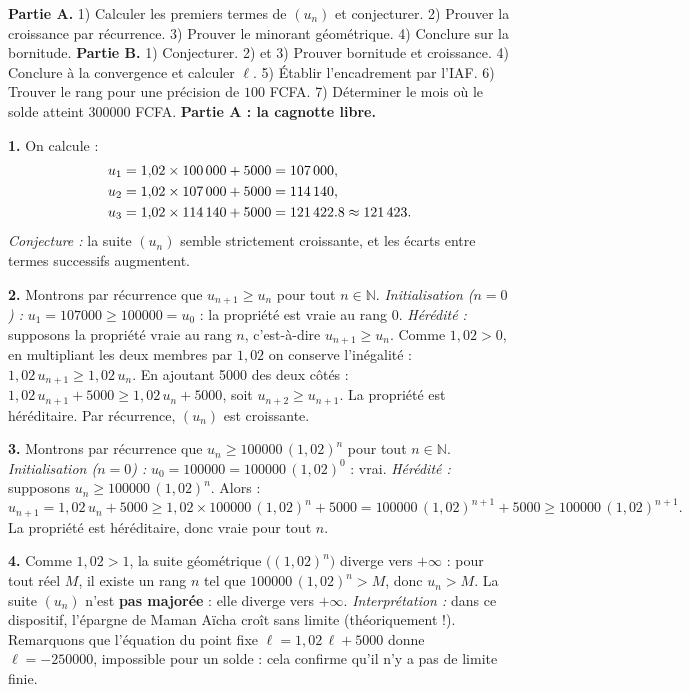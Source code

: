 \documentclass[11pt]{article}
\newcommand{\cle}[1]{{\popxbold\color{popdark}#1}}
\newcounter{popsec}
\newcounter{popsub}
\newcommand{\courssub}[1]{%
  \stepcounter{popsub}%
  \par\vspace{9pt}\noindent{\popxbold\fontsize{11.5}{13}\selectfont\color{popink}{\color{poporange}\thepopsec.\thepopsub}\hspace{6pt}#1}\par\nopagebreak\vspace{4pt}
}
\begin{document}
\courssub{Démarche et corrigé commenté}

\begin{exoresolu}
\textbf{Partie A.} 1) Calculer les premiers termes de $(u_n)$ et conjecturer. 2) Prouver la croissance par récurrence. 3) Prouver le minorant géométrique. 4) Conclure sur la bornitude. \textbf{Partie B.} 1) Conjecturer. 2) et 3) Prouver bornitude et croissance. 4) Conclure à la convergence et calculer $\ell$. 5) Établir l'encadrement par l'IAF. 6) Trouver le rang pour une précision de $100$ FCFA. 7) Déterminer le mois où le solde atteint \num{300000} FCFA.
\tcblower
\textbf{Partie A : la cagnotte libre.}

\textbf{1.} On calcule :
\begin{align*}
u_1 &= 1{,}02\times \num{100000} + \num{5000} = \num{107000},\\
u_2 &= 1{,}02\times \num{107000} + \num{5000} = \num{114140},\\
u_3 &= 1{,}02\times \num{114140} + \num{5000} = \num{121422{,}8} \approx \num{121423}.
\end{align*}
\emph{Conjecture :} la suite $(u_n)$ semble strictement croissante, et les écarts entre termes successifs augmentent.

\textbf{2.} Montrons par récurrence que $u_{n+1}\geq u_n$ pour tout $n\in\mathbb{N}$.
\emph{Initialisation ($n=0$) :} $u_1 = \num{107000} \geq \num{100000} = u_0$ : la propriété est vraie au rang $0$.
\emph{Hérédité :} supposons la propriété vraie au rang $n$, c'est-à-dire $u_{n+1}\geq u_n$.
Comme $1{,}02>0$, en multipliant les deux membres par $1{,}02$ on conserve l'inégalité :
$1{,}02\,u_{n+1} \geq 1{,}02\,u_n$.
En ajoutant \num{5000} des deux côtés :
$1{,}02\,u_{n+1} + \num{5000} \geq 1{,}02\,u_n + \num{5000}$, soit $u_{n+2} \geq u_{n+1}$.
La propriété est héréditaire. Par récurrence, $(u_n)$ est \cle{croissante}.

\textbf{3.} Montrons par récurrence que $u_n \geq \num{100000}\,(1{,}02)^n$ pour tout $n\in\mathbb{N}$.
\emph{Initialisation ($n=0$) :} $u_0 = \num{100000} = \num{100000}\,(1{,}02)^0$ : vrai.
\emph{Hérédité :} supposons $u_n \geq \num{100000}\,(1{,}02)^n$.
Alors :
\[ u_{n+1} = 1{,}02\,u_n + \num{5000} \geq 1{,}02\times \num{100000}\,(1{,}02)^n + \num{5000} = \num{100000}\,(1{,}02)^{n+1} + \num{5000} \geq \num{100000}\,(1{,}02)^{n+1}. \]
La propriété est héréditaire, donc vraie pour tout $n$.

\textbf{4.} Comme $1{,}02>1$, la suite géométrique $\bigl((1{,}02)^n\bigr)$ diverge vers $+\infty$ : pour tout réel $M$, il existe un rang $n$ tel que $\num{100000}\,(1{,}02)^n > M$, donc $u_n > M$.
La suite $(u_n)$ n'est \textbf{pas majorée} : elle diverge vers $+\infty$.
\emph{Interprétation :} dans ce dispositif, l'épargne de Maman Aïcha croît sans limite (théoriquement !). Remarquons que l'équation du point fixe $\ell = 1{,}02\,\ell + \num{5000}$ donne $\ell = -\num{250000}$, impossible pour un solde : cela confirme qu'il n'y a pas de limite finie.


\end{exoresolu}
\end{document}
